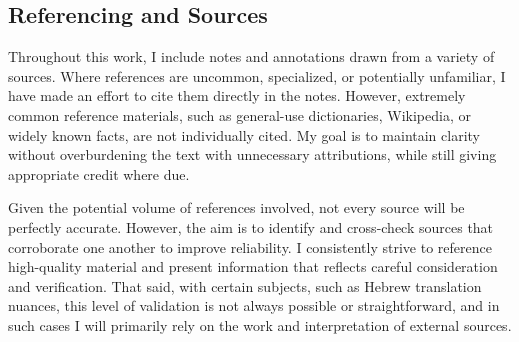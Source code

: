 \medskip



\medskip





\subsection*{Referencing and Sources}

Throughout this work, I include notes and annotations drawn from a variety of sources. Where references are uncommon, specialized, or potentially unfamiliar, I have made an effort to cite them directly in the notes. However, extremely common reference materials, such as general-use dictionaries, Wikipedia, or widely known facts, are not individually cited. My goal is to maintain clarity without overburdening the text with unnecessary attributions, while still giving appropriate credit where due.

\tab Given the potential volume of references involved, not every source will be perfectly accurate. However, the aim is to identify and cross-check sources that corroborate one another to improve reliability. I consistently strive to reference high-quality material and present information that reflects careful consideration and verification. That said, with certain subjects, such as Hebrew translation nuances, this level of validation is not always possible or straightforward, and in such cases I will primarily rely on the work and interpretation of external sources.




